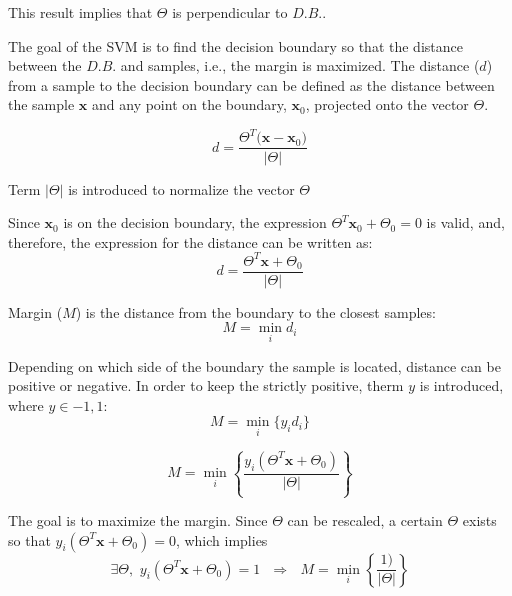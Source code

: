 \documentclass{article}
\begin{document}
This result implies that $\Theta$ is perpendicular to $D.B.$.

The goal of the SVM is to find the decision boundary so that the distance between the $D.B.$ and samples, i.e., the margin is maximized. The distance ($d$) from a sample to the decision boundary can be defined as the distance between the sample $\mathbf{x}$ and any point on the boundary, $\mathbf{x}_0$, projected onto the vector $\Theta$.

\begin{equation} 
d = \frac{\Theta^T \big(\mathbf{x} - \mathbf{x}_0\big)}{\big\vert \Theta \big\vert}
\end{equation}

Term $\vert \Theta \vert$ is introduced to normalize the vector $\Theta$

Since $\mathbf{x}_0$ is on the decision boundary, the expression $\Theta^T \mathbf{x}_0 + \Theta_0 = 0$ is valid, and, therefore, the expression for the distance can be written as:
\begin{equation} 
d = \frac{\Theta^T \mathbf{x} + \Theta_0}{\big\vert \Theta \big\vert}
\end{equation}

Margin ($M$) is the distance from the boundary to the closest samples:
\begin{equation} 
M = \min_i d_i
\end{equation}

Depending on which side of the boundary the sample is located, distance can be positive or negative. In order to keep the strictly positive, therm $y$ is introduced, where $y \in {-1,1}$:
\begin{equation} 
M = \min_i \big\{y_id_i\big\}
\end{equation}

\begin{equation} 
M = \min_i \left\{ \frac{y_i \left(\Theta^T \mathbf{x} + \Theta_0\right)}{\left\vert \Theta \right\vert} \right\}
\end{equation}

The goal is to maximize the margin. Since $\Theta$ can be rescaled, a certain $\Theta$ exists so that $y_i \left(\Theta^T \mathbf{x} + \Theta_0\right) = 0$, which implies
\begin{equation} 
\exists \Theta, \,\, y_i \left(\Theta^T \mathbf{x} + \Theta_0\right) = 1 \,\,\,\, \Rightarrow \,\,\,\, M = \min_i \left\{ \frac{1)}{\left\vert \Theta \right\vert} \right\}
\end{equation}
\end{document}
